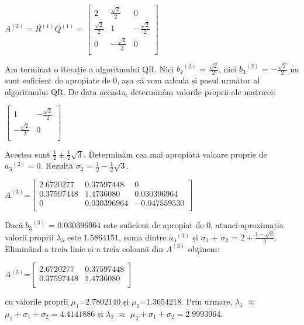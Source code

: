 \documentclass{exam}
\begin{document}
${A}^{(2)} = R^{(1)}Q^{(1)} = \begin{bmatrix}
		2                  & \frac{\sqrt{2}}{2}  & 0                   \\
		\frac{\sqrt{2}}{2} & 1                   & -\frac{\sqrt{2}}{2} \\
		0                  & -\frac{\sqrt{2}}{2} & 0                   \\
	\end{bmatrix}$

Am terminat o iterație a algoritmului QR. Nici ${b_{2}}^{(2)}$ = $\frac{\sqrt{2}}{2}$, nici ${b_{3}}^{(2)}$ = $-\frac{\sqrt{2}}{2}$ nu sunt suficient de apropiate de $0$, așa că vom calcula și pasul următor al algoritmului QR. De data aceasta, determinăm valorile proprii ale matricei:

$\begin{bmatrix}
		1                   & -\frac{\sqrt{2}}{2} \\
		-\frac{\sqrt{2}}{2} & 0                   \\
	\end{bmatrix}$

Acestea sunt $\frac{1}{2} \pm \frac{1}{2}\sqrt{3}.$ Determinăm cea mai apropiată valoare proprie de ${a_{3}}^{(2)}=0$. Rezultă $\sigma_{2}$ = $\frac{1}{2} - \frac{1}{2}\sqrt{3}$.

$A^{(3)}$=$\begin{bmatrix}
		2.6720277  & 0.37597448  & 0            \\
		0.37597448 & 1.4736080   & 0.030396964  \\
		0          & 0.030396964 & -0.047559530 \\
	\end{bmatrix}$

Dacă ${b_{3}}^{(3)}$ = $0.030396964$ este suficient de apropiat de $0$, atunci aproximația valorii proprii $\lambda_{3}$ este $1.5864151$, suma dintre ${a_{3}}^{(3)}$ și $\sigma_{1}$ + $\sigma_{2}$ = $2 + \frac{1-\sqrt{3}}{2}$.
Eliminând a treia linie și a treia coloană din $A^{(3)}$ obţinem:

$A^{(3)}$=$\begin{bmatrix}
		2.6720277  & 0.37597448 \\
		0.37597448 & 1.4736080  \\
	\end{bmatrix}$

\noindent cu valorile proprii $\mu_{1}$=$2.7802140$ și $\mu_{2}$=$1.3654218$. Prin urmare, $\lambda_{1}$ $\approx$
$\mu_{1}+\sigma_{1}+\sigma_{2} =4.4141886$ și $\lambda_{2}$ $\approx$ $\mu_{2}+\sigma_{1}+\sigma_{2} = 2.9993964$.
\end{document}
